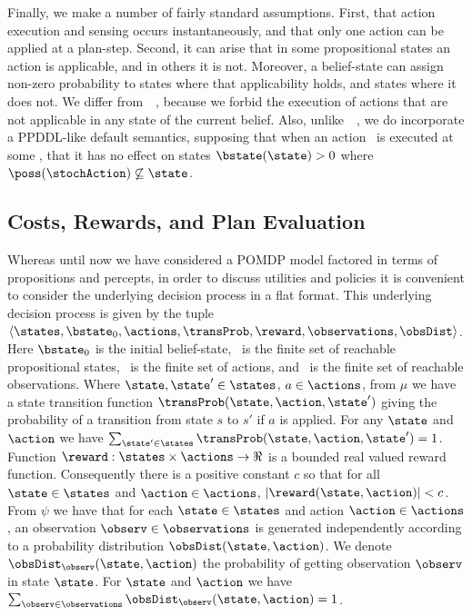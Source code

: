 \documentclass[letterpaper]{article}
\begin{document}
Finally, we make a number of fairly standard assumptions. First, that
action execution and sensing occurs instantaneously, and that only one
action can be applied at a plan-step. Second, it can arise that in
some propositional states an action is applicable, and in others it is
not. Moreover, a belief-state can assign non-zero probability to
states where that applicability holds, and states where it does
not. We differ
from~\citeauthor{younes:littman:04}~\citeyear{younes:littman:04},
because we forbid the execution of actions that are not applicable in
any state of the current belief.  Also,
unlike~\citeauthor{hoffmann:brafman:2006}~\citeyear{hoffmann:brafman:2006},
we do incorporate a PPDDL-like default semantics, supposing that when
an action \stochAction\ is executed at some \bstate, that it has no
effect on states $\bstate(\state) > 0$ where $\poss(\stochAction)
\not\subseteq \state$.


\subsection{Costs, Rewards, and Plan Evaluation}

Whereas until now we have considered a POMDP model factored in terms
of propositions and percepts, in order to discuss utilities and
policies it is convenient to consider the underlying decision process
in a flat format. This underlying decision process is given by the
tuple $\langle \states, \bstate_0, \actions, \transProb, \reward,
\observations, \obsDist \rangle$. Here $\bstate_0$ is the initial
belief-state, \states\ is the finite set of reachable propositional
states, \actions\ is the finite set of actions, and \observations\ is
the finite set of reachable observations.  Where $\state, \state' \in
\states$, $a \in \actions$, from $\mu$ we have a state transition
function $\transProb(\state, \action, \state')$ giving the probability
of a transition from state $s$ to $s'$ if $a$ is applied. For any
$\state$ and $\action$ we have $\sum_{\state' \in \states}
\transProb(\state, \action, \state') = 1$.
Function $\reward:\states \times \actions \to \Re$ is a bounded real
valued reward function.  Consequently there is a positive constant $c$
so that for all $\state \in \states$ and $\action \in \actions$,
$|\reward(\state, \action)| < c$.
From $\psi$ we have that for each $\state \in \states$ and action
$\action \in \actions$, an observation $\observ \in \observations$ is
generated independently according to a probability distribution
$\obsDist(\state, \action)$. We denote $\obsDist_\observ(\state,
\action)$ the probability of getting observation $\observ$ in state
$\state$. For $\state$ and $\action$ we have $\sum_{\observ \in
\observations} \obsDist_\observ(\state, \action) = 1$.
\end{document}
